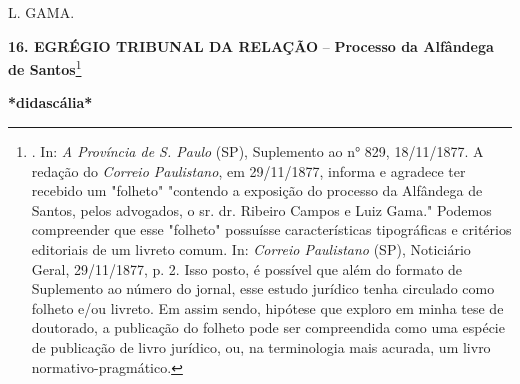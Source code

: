 \protect\hypertarget{Secao_Sem_Titulo-21}{}{}L. GAMA.

\textbf{16. EGRÉGIO TRIBUNAL DA RELAÇÃO} -- \textbf{Processo da
Alfândega de Santos}\footnote{. In: \emph{A Província de S. Paulo} (SP),
  Suplemento ao n° 829, 18/11/1877. A redação do \emph{Correio
  Paulistano}, em 29/11/1877, informa e agradece ter recebido um
  "folheto" "contendo a exposição do processo da Alfândega de Santos,
  pelos advogados, o sr. dr. Ribeiro Campos e Luiz Gama." Podemos
  compreender que esse "folheto" possuísse características tipográficas
  e critérios editoriais de um livreto comum. In: \emph{Correio
  Paulistano} (SP), Noticiário Geral, 29/11/1877, p. 2. Isso posto, é
  possível que além do formato de Suplemento ao número do jornal, esse
  estudo jurídico tenha circulado como folheto e/ou livreto. Em assim
  sendo, hipótese que exploro em minha tese de doutorado, a publicação
  do folheto pode ser compreendida como uma espécie de publicação de
  livro jurídico, ou, na terminologia mais acurada, um livro
  normativo-pragmático.}

\textbf{*didascália*}

